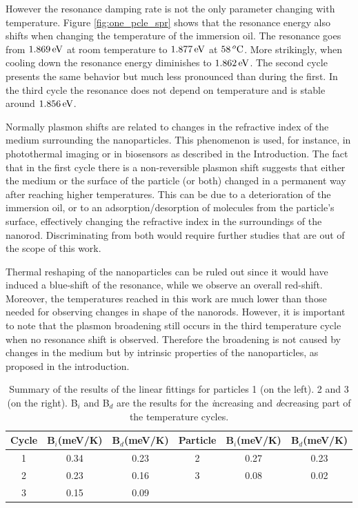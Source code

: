 However the resonance damping rate is not the only parameter changing with
temperature. Figure \ref{fig:one_pcle_spr} shows that the resonance energy also
shifts when changing the temperature of the immersion oil. The resonance goes
from $1.869\,\textrm{eV}$ at room temperature to $1.877\,\textrm{eV}$ at $58\,^o\textrm{C}$. More
strikingly, when cooling down the resonance energy diminishes to $1.862\,\textrm{eV}$. The
second cycle presents the same behavior but much less pronounced than during
the first. In the third cycle the resonance does not depend on temperature and
is stable around $1.856\,\textrm{eV}$.

Normally plasmon shifts are related to changes in the refractive index of the
medium surrounding the nanoparticles. This phenomenon is used, for instance, in
photothermal imaging\cite{Berciaud2006,Gaiduk2010b} or in
biosensors\cite{Zijlstra2012} as described in the Introduction. The fact that in
the first cycle there is a non-reversible plasmon shift suggests that either the
medium or the surface of the particle (or both) changed in a permanent way after
reaching higher temperatures. This can be due to a deterioration of the
immersion oil, or to an adsorption/desorption of molecules from the particle's
surface, effectively changing the refractive index in the surroundings of the
nanorod. Discriminating from both would require further studies that are out of
the scope of this work. 

Thermal reshaping of the nanoparticles can be ruled out since it would have
induced a blue-shift of the resonance\cite{Liu2009,Horiguchi2008}, while we
observe an overall red-shift. Moreover, the temperatures reached in this work
are much lower than those needed for observing changes in shape of the nanorods.
However, it is important to note that the plasmon broadening still occurs in the
third temperature cycle when no resonance shift is observed. Therefore the
broadening is not caused by changes in the medium but by intrinsic properties of
the nanoparticles, as proposed in the introduction.

\begin{table}
\begin{tabular}{ c | c c || c | c | c}
  Cycle & B$_i$(meV/K) & B$_d$(meV/K) & Particle & B$_i$(meV/K) & B$_d$(meV/K)\\
  \hline
  1 & 0.34 & 0.23 & 2 & 0.27 & 0.23\\
  2 & 0.23 & 0.16 & 3 & 0.08 & 0.02\\
  3 & 0.15 & 0.09 & & \\

\end{tabular}
  \caption{Summary of the results of the linear fittings for particles 1 (on
  the left). 2 and 3 (on the right). B$_i$ and B$_d$ are the results for the
  \textit{i}ncreasing and \textit{d}ecreasing part of the temperature
  cycles.}\label{table-results}
\end{table}

